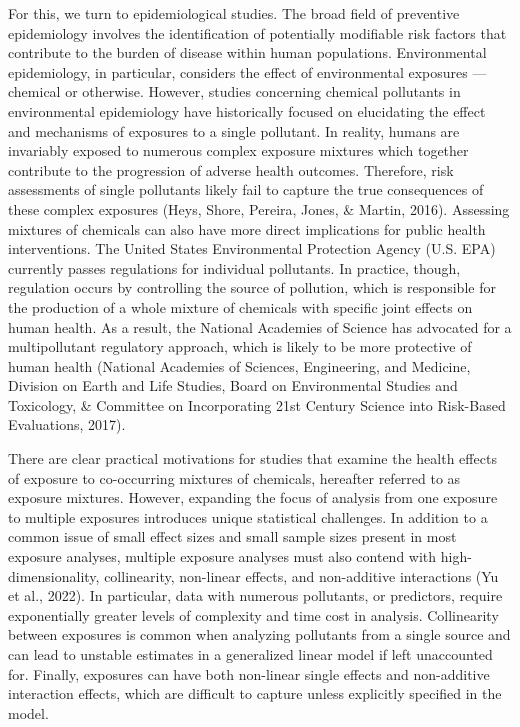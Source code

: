 \documentclass[12pt, twoside]{amherstthesis}
\begin{document}
For this, we turn to epidemiological studies. The broad field of preventive epidemiology involves the identification of potentially modifiable risk factors that contribute to the burden of disease within human populations. Environmental epidemiology, in particular, considers the effect of environmental exposures --- chemical or otherwise. However, studies concerning chemical pollutants in environmental epidemiology have historically focused on elucidating the effect and mechanisms of exposures to a single pollutant. In reality, humans are invariably exposed to numerous complex exposure mixtures which together contribute to the progression of adverse health outcomes. Therefore, risk assessments of single pollutants likely fail to capture the true consequences of these complex exposures (Heys, Shore, Pereira, Jones, \& Martin, 2016). Assessing mixtures of chemicals can also have more direct implications for public health interventions. The United States Environmental Protection Agency (U.S. EPA) currently passes regulations for individual pollutants. In practice, though, regulation occurs by controlling the source of pollution, which is responsible for the production of a whole mixture of chemicals with specific joint effects on human health. As a result, the National Academies of Science has advocated for a multipollutant regulatory approach, which is likely to be more protective of human health (National Academies of Sciences, Engineering, and Medicine, Division on Earth and Life Studies, Board on Environmental Studies and Toxicology, \& Committee on Incorporating 21st Century Science into Risk-Based Evaluations, 2017).

There are clear practical motivations for studies that examine the health effects of exposure to co-occurring mixtures of chemicals, hereafter referred to as exposure mixtures. However, expanding the focus of analysis from one exposure to multiple exposures introduces unique statistical challenges. In addition to a common issue of small effect sizes and small sample sizes present in most exposure analyses, multiple exposure analyses must also contend with high-dimensionality, collinearity, non-linear effects, and non-additive interactions (Yu et al., 2022). In particular, data with numerous pollutants, or predictors, require exponentially greater levels of complexity and time cost in analysis. Collinearity between exposures is common when analyzing pollutants from a single source and can lead to unstable estimates in a generalized linear model if left unaccounted for. Finally, exposures can have both non-linear single effects and non-additive interaction effects, which are difficult to capture unless explicitly specified in the model.
\end{document}
